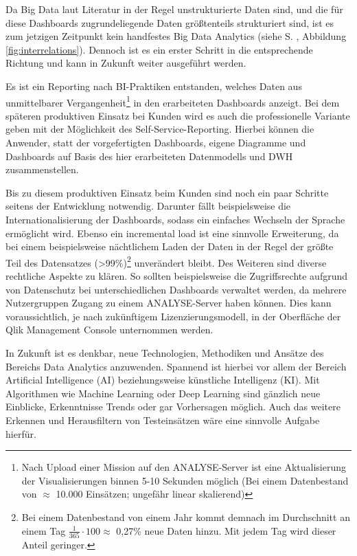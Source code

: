 Da Big Data laut Literatur \cite{Fischer.2014, Hausler.2018} in der Regel unstrukturierte Daten sind, und die für diese Dashboards zugrundeliegende Daten größtenteils strukturiert sind, ist es zum jetzigen Zeitpunkt kein handfestes \glqq Big Data Analytics\grqq{} (siehe  S. \pageref{fig:interrelations}, Abbildung \ref{fig:interrelations}).
Dennoch ist es ein erster Schritt in die entsprechende Richtung und kann in Zukunft weiter ausgeführt werden.

Es ist ein Reporting nach \gls{BI}-Praktiken entstanden, welches Daten aus unmittelbarer Vergangenheit\footnote{Nach Upload einer Mission auf den \gls{ANALYSE}-Server ist eine Aktualisierung der Visualisierungen binnen 5-10 Sekunden möglich (Bei einem Datenbestand von $\approx$ 10.000 Einsätzen; ungefähr linear skalierend)} in den erarbeiteten Dashboards anzeigt.
Bei dem späteren produktiven Einsatz bei Kunden wird es auch die professionelle Variante geben mit der Möglichkeit des Self-Service-Reporting.
Hierbei können die Anwender, statt der vorgefertigten Dashboards, eigene Diagramme und Dashboards auf Basis des hier erarbeiteten Datenmodells und \gls{DWH} zusammenstellen.

Bis zu diesem produktiven Einsatz beim Kunden sind noch ein paar Schritte seitens der Entwicklung notwendig.
Darunter fällt beispielsweise die Internationalisierung der Dashboards, sodass ein einfaches Wechseln der Sprache ermöglicht wird.
Ebenso ein \glqq incremental load\grqq{} ist eine sinnvolle Erweiterung, da bei einem beispielsweise nächtlichem Laden der Daten in der Regel der größte Teil des Datensatzes (>99\%)\footnote{Bei einem Datenbestand von einem Jahr kommt demnach im Durchschnitt an einem Tag 
$\frac{1}{365} \cdot100 \approx$ 0,27\% neue Daten hinzu. Mit jedem Tag wird dieser Anteil geringer.}  unverändert bleibt.
Des Weiteren sind diverse rechtliche Aspekte zu klären.
So sollten beispielsweise die Zugriffsrechte aufgrund von Datenschutz bei unterschiedlichen Dashboards verwaltet werden, da mehrere Nutzergruppen Zugang zu einem \gls{ANALYSE}-Server haben können.
Dies kann voraussichtlich, je nach zukünftigem Lizenzierungsmodell, in der Oberfläche der Qlik Management Console unternommen werden.

In Zukunft ist es denkbar, neue Technologien, Methodiken und Ansätze des Bereichs \glqq Data Analytics\grqq{} anzuwenden.
Spannend ist hierbei vor allem der Bereich \glqq Artificial Intelligence\grqq{} (AI) beziehungsweise künstliche Intelligenz (KI).
Mit Algorithmen wie \glqq Machine Learning\grqq{} oder \glqq Deep Learning\grqq{} sind gänzlich neue Einblicke, Erkenntnisse Trends oder gar Vorhersagen möglich.
Auch das weitere Erkennen und Herausfiltern von Testeinsätzen wäre eine sinnvolle Aufgabe hierfür.

